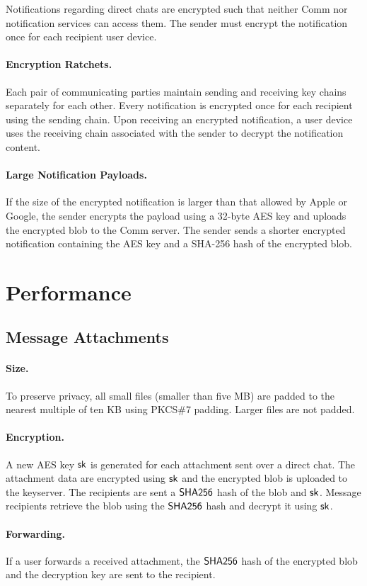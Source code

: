 \documentclass{article}
\newcommand{\sk}{{\sf sk}}
\newcommand{\sha}{\sf SHA256}
\begin{document}
Notifications regarding direct chats are encrypted such that neither Comm nor notification services can access them. The sender must encrypt the notification once for each recipient user device.

\paragraph{Encryption Ratchets.} Each pair of communicating parties maintain sending and receiving key chains separately for each other. Every notification is encrypted once for each recipient using the sending chain. Upon receiving an encrypted notification, a user device uses the receiving chain associated with the sender to decrypt the notification content.

\paragraph{Large Notification Payloads.} If the size of the encrypted notification is larger than that allowed by Apple or Google, the sender encrypts the payload using a 32-byte AES key and uploads the encrypted blob to the Comm server. The sender sends a shorter encrypted notification containing the AES key and a SHA-256 hash of the encrypted blob.

\section{Performance}

\subsection{Message Attachments}

\paragraph{Size.} To preserve privacy, all small files (smaller than five MB) are padded to the nearest multiple of ten KB using PKCS\#7 padding. Larger files are not padded.

\paragraph{Encryption.} A new AES key $\sk$ is generated for each attachment sent over a direct chat. The attachment data are encrypted using $\sk$ and the encrypted blob is uploaded to the keyserver. The recipients are sent a $\sha$ hash of the blob and $\sk$. Message recipients retrieve the blob using the $\sha$ hash and decrypt it using $\sk$.

\paragraph{Forwarding.} If a user forwards a received attachment, the $\sha$ hash of the encrypted blob and the decryption key are sent to the recipient.


\clearpage


\end{document}
